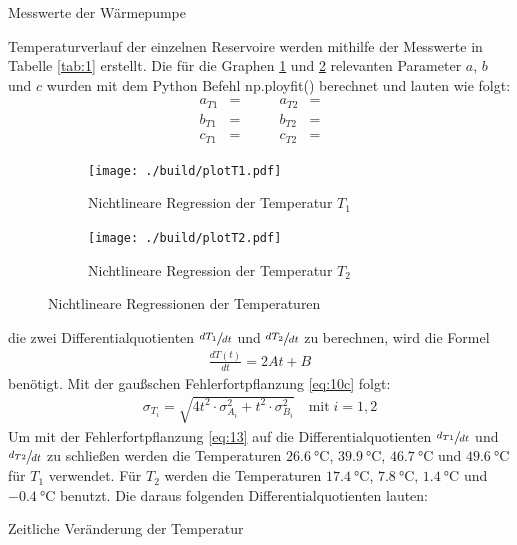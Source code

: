 \begin{table}[H]
    \centering
    
    \caption{Messwerte der Wärmepumpe}
    \label{tab:1}
\end{table}
\newpage

\justifying Temperaturverlauf der einzelnen Reservoire werden mithilfe der Messwerte in Tabelle \ref{tab:1} erstellt. Die für
die Graphen \ref{fig:3a} und \ref{fig:3b} relevanten Parameter $a$, $b$ und $c$ wurden mit dem Python Befehl np.ployfit() \cite{numpy}
berechnet und lauten wie folgt:
\begin{subequations}
\begin{align}
    a_{T1} &= \text{} \qquad &a_{T2} &= \text{} \label{eq:11a}\\
    b_{T1} &= \text{} \qquad &b_{T2} &= \text{} \label{eq:11b}\\
    c_{T1} &= \text{} \qquad &c_{T2} &= \text{} \label{eq:11c}
\end{align}
\end{subequations}

\begin{figure}[H]
    \begin{subfigure}{0.495\linewidth}
        \centering
        \texttt{[image: ./build/plotT1.pdf]}
        \caption{Nichtlineare Regression der Temperatur $T_1$}
        \label{fig:3a}
    \end{subfigure}
    \begin{subfigure}{0.495\linewidth}
        \centering
        \texttt{[image: ./build/plotT2.pdf]}
        \caption{Nichtlineare Regression der Temperatur $T_2$}
        \label{fig:3b}
    \end{subfigure}
    \caption{Nichtlineare Regressionen der Temperaturen}
    \label{fig:3}
\end{figure}

\justifying die zwei Differentialquotienten $\sfrac{dT_{1}}{dt}$ und $\sfrac{dT_{2}}{dt}$ zu berechnen, wird die Formel
\begin{align}
    \frac{dT(t)}{dt} = 2At + B \label{eq:12}
\end{align}
benötigt. Mit der gaußschen Fehlerfortpflanzung \eqref{eq:10c} folgt:
\begin{align}
    \sigma_{T_i} = \sqrt{4t^2 \cdot \sigma _{A_i}^2 + t^2 \cdot \sigma _{B_i}^2} \label{eq:13}\quad \text{mit}\; i = 1,2
\end{align}
Um mit der Fehlerfortpflanzung \eqref{eq:13} auf die Differentialquotienten $\sfrac{d_{T1}}{dt}$ und $\sfrac{d_{T2}}{dt}$ zu schließen werden die 
Temperaturen $\SI{26.6}{\celsius}$, $\SI{39.9}{\celsius}$, $\SI{46.7}{\celsius}$ und $\SI{49.6}{\celsius}$ für $T_1$ verwendet. Für $T_2$ 
werden die Temperaturen $\SI{17.4}{\celsius}$, $\SI{7.8}{\celsius}$, $\SI{1.4}{\celsius}$ und $\SI{-0.4}{\celsius}$ benutzt.
Die daraus folgenden Differentialquotienten lauten:
\begin{table}[H]
    \centering
    
    \caption{Zeitliche Veränderung der Temperatur} \label{tab:2}
\end{table}


